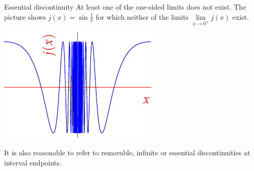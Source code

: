 \begin{description}
\begin{minipage}[t]{0.34\linewidth}
	\end{minipage}
	\smallbreak
	\begin{minipage}[t]{0.65\linewidth}\vspace{0pt}
		\item[Essential discontinuity] At least one of the one-sided limits does not exist. The picture shows $j(x)=\sin\frac 1x$ for which neither of the limits $\lim\limits_{x\to 0^\pm}j(x)$ exist.
	\end{minipage}
	\hfill
	\begin{minipage}[t]{0.34\linewidth}\vspace{0pt}
		\flushright\includegraphics{discont5}
	\end{minipage}
\end{description}
It is also reasonable to refer to removable, infinite or essential discontinuities at interval endpoints.

\clearpage


